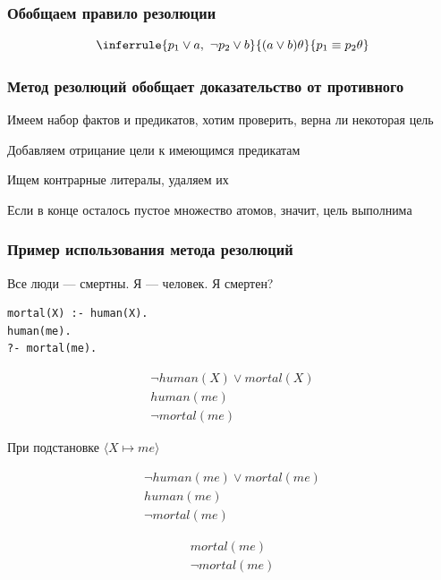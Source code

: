 \documentclass{beamer}
\begin{document}
\begin{frame}[fragile]
  \frametitle{Обобщаем правило резолюции}
  \[\inferrule{p_1 \vee a, \ \neg p_2 \vee b}{(a \vee b)\theta}{p_1 \equiv p_2 \theta}\]
\end{frame}


\begin{frame}[fragile]
  \frametitle{Метод резолюций обобщает доказательство от противного}

  \begin{center}
    Имеем набор фактов и предикатов, хотим проверить, верна ли некоторая цель
  \end{center}

  \begin{center}
    Добавляем отрицание цели к имеющимся предикатам
  \end{center}

  \begin{center}
    Ищем контрарные литералы, удаляем их
  \end{center}

  \begin{center}
    Если в конце осталось пустое множество атомов, значит, цель выполнима
  \end{center}
\end{frame}

\begin{frame}[fragile]
  \frametitle{Пример использования метода резолюций}
Все люди --- смертны. Я --- человек. Я смертен?

\begin{verbatim}
mortal(X) :- human(X).
human(me).
?- mortal(me).
\end{verbatim}

\[
  \begin{array}{c}
    \neg human(X) \vee mortal(X) \\
    human(me) \\
    \neg mortal(me)
  \end{array}
\]

При подстановке $\langle X \mapsto me \rangle$

\[
  \begin{array}{c}
    \neg human(me) \vee mortal(me) \\
    human(me) \\
    \neg mortal(me)
  \end{array}
\]

\[
  \begin{array}{c}
    mortal(me) \\
    \neg mortal(me)
  \end{array}
\]

\end{frame}
\end{document}
